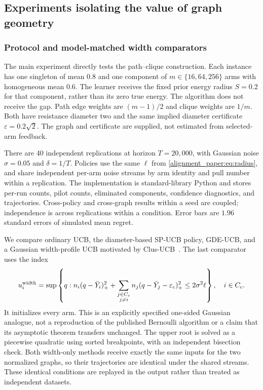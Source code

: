 \subsection{Experiments isolating the value of graph geometry}
\subsubsection{Protocol and model-matched width comparators}
The main experiment directly tests the path--clique construction. Each instance has one singleton of mean $0.8$ and one component of $m\in\{16,64,256\}$ arms with homogeneous mean $0.6$. The learner receives the fixed prior energy radius $S=0.2$ for that component, rather than its zero true energy. The algorithm does not receive the gap. Path edge weights are $(m-1)/2$ and clique weights are $1/m$. Both have resistance diameter two and the same implied diameter certificate $\varepsilon=0.2\sqrt2$. The graph and certificate are supplied, not estimated from selected-arm feedback.

There are 40 independent replications at horizon $T=20{,}000$, with Gaussian noise $\sigma=0.05$ and $\delta=1/T$. Policies use the same $\ell$ from \eqref{alignment_paper:eq:radius}, and share independent per-arm noise streams by arm identity and pull number within a replication. The implementation is standard-library Python and stores per-run counts, pilot counts, eliminated components, confidence diagnostics, and trajectories. Cross-policy and cross-graph results within a seed are coupled; independence is across replications within a condition. Error bars are $1.96$ standard errors of simulated mean regret.

We compare ordinary UCB, the diameter-based SP-UCB policy, GDE-UCB, and a Gaussian width-profile UCB motivated by Clus-UCB~\cite{collected19}. The last comparator uses the index
\begin{equation}
 u_i^{\rm width}=\sup\left\{q:
 n_i(q-\bar Y_i)_+^2+
 \sum_{\substack{j\in C_c\\j\ne i}}n_j(q-\bar Y_j-\varepsilon_c)_+^2
 \le2\sigma^2\ell\right\},\quad i\in C_c.
 \label{alignment_paper:eq:widthprofile}
\end{equation}
It initializes every arm. This is an explicitly specified one-sided Gaussian analogue, not a reproduction of the published Bernoulli algorithm or a claim that its asymptotic theorem transfers unchanged. The upper root is solved as a piecewise quadratic using sorted breakpoints, with an independent bisection check. Both width-only methods receive exactly the same inputs for the two normalized graphs, so their trajectories are identical under the shared streams. These identical conditions are replayed in the output rather than treated as independent datasets.

